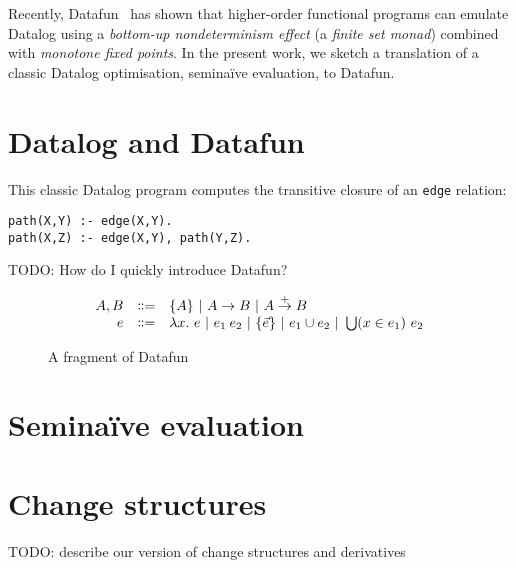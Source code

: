 \documentclass[sigplan,screen,review,timestamp,dvipsnames]{acmart}
\newcommand{\todo}[1]{{\color{ACMPurple}#1}}
\newcommand{\fn}{\lambda}
\newcommand{\binder}{.~}
\newcommand{\bind}[1]{#1\binder}
\newcommand{\fnof}[1]{\fn\bind{#1}}
\begin{document}
Recently, Datafun~\cite{datafun} has shown that higher-order functional programs
can emulate Datalog using a \emph{bottom-up nondeterminism effect} (a
\emph{finite set monad}) combined with \emph{monotone fixed points}. In the
present work, we sketch a translation of a classic Datalog optimisation,
semina\"ive evaluation, to Datafun.


\section{Datalog and Datafun}

This classic Datalog program computes the transitive closure of an \texttt{edge}
relation:
%
\begin{lstlisting}
path(X,Y) :- edge(X,Y).
path(X,Z) :- edge(X,Y), path(Y,Z).
\end{lstlisting}

\todo{TODO: How do I quickly introduce Datafun?}

\newcommand{\bnfeq}{\dblcolon=}
\newcommand{\bnfcont}{}
\newcommand{\pipe}{~|~}
\newcommand{\x}{\times}

\newcommand{\mto}{\overset{+}{\to}}
\newcommand{\tset}[1]{\{#1\}}
\newcommand{\eset}[1]{\{#1\}}

\begin{figure}
  \[
  \begin{array}{rcl}
    A,B &\bnfeq& \tset{A} \pipe A \to B \pipe A \mto B
    \\
    e &\bnfeq& \fnof{x} e \pipe e_1\:e_2 \pipe \eset{\vec{e}} \pipe e_1 \cup e_2
    \pipe \bigcup(x \in e_1)~ e_2
  \end{array}
  \]\vspace{-1em}
  \caption{A fragment of Datafun}
  \label{fig:datafun}
\end{figure}

\section{Semina\"ive evaluation}

\section{Change structures}

\todo{TODO: describe our version of change structures and derivatives}
\end{document}
